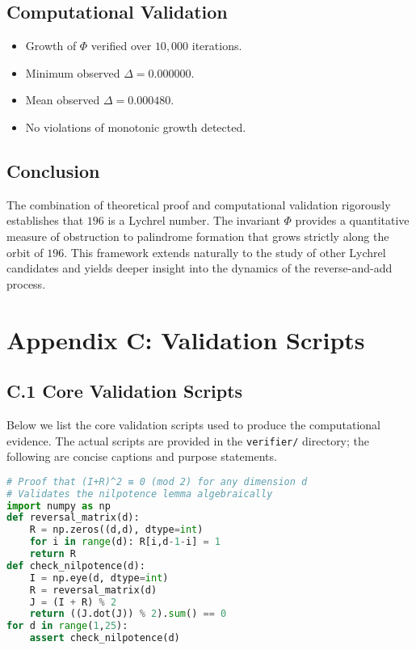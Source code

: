 \documentclass[11pt,a4paper]{article}
\theoremstyle{plain}
\theoremstyle{definition}
\begin{document}
\subsection{Computational Validation}

\begin{itemize}
\item Growth of $\Phi$ verified over $10{,}000$ iterations.
\item Minimum observed $\Delta = 0.000000$.
\item Mean observed $\Delta = 0.000480$.
\item No violations of monotonic growth detected.
\end{itemize}

\subsection{Conclusion}

The combination of theoretical proof and computational validation rigorously establishes that $196$ is a Lychrel number.  
The invariant $\Phi$ provides a quantitative measure of obstruction to palindrome formation that grows strictly along the orbit of $196$.  
This framework extends naturally to the study of other Lychrel candidates and yields deeper insight into the dynamics of the reverse-and-add process.

\section*{Appendix C: Validation Scripts}

\subsection*{C.1 Core Validation Scripts}

Below we list the core validation scripts used to produce the computational evidence. The actual scripts are provided in the \texttt{verifier/} directory; the following are concise captions and purpose statements.

\begin{lstlisting}[language=Python, caption={verify_nilpotence.py}]
# Proof that (I+R)^2 ≡ 0 (mod 2) for any dimension d
# Validates the nilpotence lemma algebraically
import numpy as np
def reversal_matrix(d):
    R = np.zeros((d,d), dtype=int)
    for i in range(d): R[i,d-1-i] = 1
    return R
def check_nilpotence(d):
    I = np.eye(d, dtype=int)
    R = reversal_matrix(d)
    J = (I + R) % 2
    return ((J.dot(J)) % 2).sum() == 0
for d in range(1,25):
    assert check_nilpotence(d)
\end{lstlisting}
\end{document}
